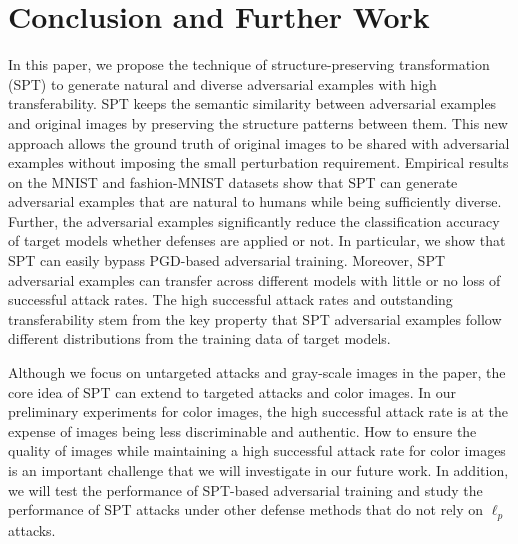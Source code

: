 \documentclass[letterpaper]{article} %
\newcommand{\red}[1]{{\color{red} #1}}
\newcommand{\blue}[1]{{\color{blue} #1}}
\begin{document}
\section{Conclusion and Further Work}
In this paper, we propose the technique of structure-preserving transformation (SPT) to generate natural and diverse adversarial examples with high transferability. %
SPT keeps the semantic similarity between adversarial examples and original images by preserving the structure patterns between them. This new approach allows the ground truth of original images to be shared with adversarial examples without imposing the small perturbation requirement.   
Empirical results on the MNIST and fashion-MNIST datasets show that SPT can generate adversarial examples that are natural to humans while being sufficiently diverse.  
Further, the adversarial examples significantly reduce the classification accuracy of target models %
whether defenses are applied or not. In particular, we show that SPT can easily bypass PGD-based adversarial training. Moreover, SPT adversarial examples can transfer across different models with little or no loss of successful attack rates. The high successful attack rates and outstanding transferability stem from the key property that SPT adversarial examples follow different distributions from the training data of target models. 

Although we focus on untargeted attacks and gray-scale images in the paper, the core idea of SPT can extend to targeted attacks and color images.  In our preliminary experiments for color images, the high successful attack rate is at the expense of images being less  discriminable and authentic.
How to ensure the quality of images %
while maintaining a high successful attack rate for color images is an important challenge that we will investigate in our future work. In addition, we will test the performance of SPT-based adversarial training and study the performance of SPT attacks under other defense methods that do not rely on $\ell_p$ attacks.  








\newpage{~~}
\newpage{}
 
\end{document}

